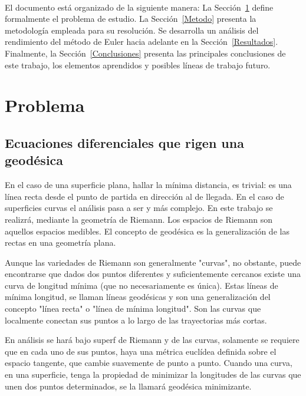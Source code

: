 \documentclass{endm}
\begin{document}
\\ 
El documento est\'a organizado de la siguiente manera: La Secci\'on~\ref{Problema} define formalmente el problema de estudio. La Secci\'on~\ref{Metodo} presenta la metodolog\'ia empleada para su resoluci\'on. Se desarrolla un an\'alisis del rendimiento del m\'etodo de Euler hacia adelante en la Secci\'on~\ref{Resultados}. Finalmente, la Secci\'on~\ref{Conclusiones} presenta las principales conclusiones de este trabajo, los elementos aprendidos y posibles l\'ineas de trabajo futuro.
\clearpage
%
\section{Problema}\label{Problema}

\subsection{Ecuaciones diferenciales que rigen una geod\'esica}


En el caso de una superficie plana, hallar la m\'inima distancia, es trivial: es una l\'inea recta desde el punto de partida en direcci\'on al de llegada. En el caso de superficies curvas el an\'alisis pasa a ser y m\'as complejo. En este trabajo se realizr\'a, mediante la geometr\'ia de Riemann. Los espacios de Riemann son aquellos espacios medibles.
El concepto de geod\'esica es la generalizaci\'on de las rectas en una geometr\'ia plana. 

Aunque las variedades de Riemann son generalmente "curvas", no obstante, puede encontrarse que dados dos puntos diferentes y suficientemente cercanos existe una curva de longitud m\'inima (que no necesariamente es \'unica). Estas l\'ineas de m\'inima longitud, se llaman l\'ineas geod\'esicas y son una generalizaci\'on del concepto "l\'inea recta" o "l\'inea de m\'inima longitud". Son las curvas que localmente conectan sus puntos a lo largo de las trayectorias m\'as cortas. 

En an\'alisis se har\'a bajo superf de Riemann y de las curvas, solamente se requiere que en cada uno de sus puntos, haya una m\'etrica eucl\'idea definida sobre el espacio tangente, que cambie suavemente de punto a punto.
 Cuando una curva, en una superficie, tenga la propiedad de minimizar la longitudes de las curvas que unen dos puntos determinados, se la llamar\'a geod\'esica minimizante.
 
\end{document}
